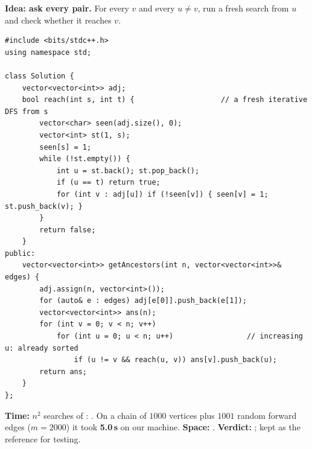 \begin{bruteforcebox}
\textbf{Idea: ask every pair.} For every $v$ and every $u \ne v$, run a fresh search from $u$ and check whether it reaches $v$.

\begin{lstlisting}[style=cpp]
#include <bits/stdc++.h>
using namespace std;

class Solution {
    vector<vector<int>> adj;
    bool reach(int s, int t) {                    // a fresh iterative DFS from s
        vector<char> seen(adj.size(), 0);
        vector<int> st(1, s);
        seen[s] = 1;
        while (!st.empty()) {
            int u = st.back(); st.pop_back();
            if (u == t) return true;
            for (int v : adj[u]) if (!seen[v]) { seen[v] = 1; st.push_back(v); }
        }
        return false;
    }
public:
    vector<vector<int>> getAncestors(int n, vector<vector<int>>& edges) {
        adj.assign(n, vector<int>());
        for (auto& e : edges) adj[e[0]].push_back(e[1]);
        vector<vector<int>> ans(n);
        for (int v = 0; v < n; v++)
            for (int u = 0; u < n; u++)                 // increasing u: already sorted
                if (u != v && reach(u, v)) ans[v].push_back(u);
        return ans;
    }
};
\end{lstlisting}

\begin{complexitybox}
\textbf{Time:} $n^2$ searches of : . On a chain of $1000$ vertices plus $1001$ random forward edges ($m = 2000$) it took \textbf{5.0\,s} on our machine. \textbf{Space:} . \textbf{Verdict:} \tle; kept as the reference for testing.
\end{complexitybox}
\end{bruteforcebox}

